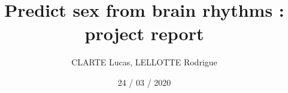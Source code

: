 \documentclass{article}
\author{CLARTE Lucas, LELLOTTE Rodrigue}
\date{24 / 03 / 2020}
\title{Predict sex from brain rhythms : project report}
\begin{document}
\maketitle
















\nocite{*}



\end{document}

